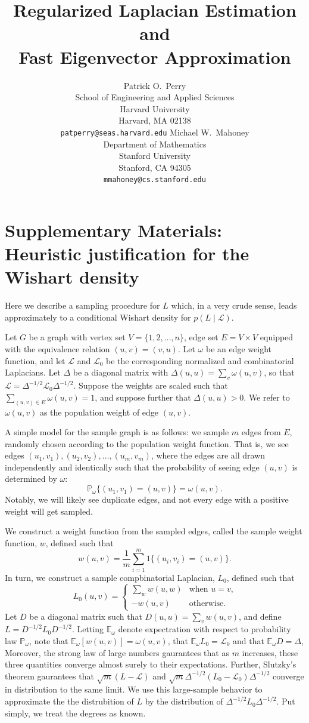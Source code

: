 \documentclass[12pt]{article}
\title{
  Regularized Laplacian Estimation
  and \\ Fast Eigenvector Approximation
}
\author{
  Patrick O.~Perry \\
  School of Engineering and Applied Sciences \\
  Harvard University \\
  Harvard, MA 02138 \\
  \texttt{patperry@seas.harvard.edu} 
  \And
  Michael W.~Mahoney \\
  Department of Mathematics \\
  Stanford University \\
  Stanford, CA 94305  \\
  \texttt{mmahoney@cs.stanford.edu}
}
\newcommand{\prob}{\mathbb{P}}
\newcommand{\E}{\mathbb{E}}
\theoremstyle{plain}
\begin{document}
\appendix

\section{Supplementary Materials: Heuristic justification for the Wishart density}
\label{sxn:justification}

Here we describe a sampling procedure for $L$ which, in a very crude
sense, leads approximately to a conditional Wishart density for $p(L
\mid \mathcal{L})$.

Let $G$ be a graph with vertex set $V = \{ 1, 2, \dotsc, n \}$, edge
set $E = V \times V$ equipped with the equivalence relation
$(u,v) = (v,u)$.  Let $\omega$ be an edge weight function, and let
$\mathcal{L}$ and $\mathcal{L}_0$ be the corresponding normalized and
combinatorial Laplacians.  Let $\Delta$ be a diagonal matrix with
$\Delta(u,u) = \sum_{v} \omega(u,v)$, so that
$\mathcal{L} = \Delta^{-1/2} \mathcal{L}_0 \Delta^{-1/2}$.  Suppose
the weights are scaled such that $\sum_{(u,v) \in E} \omega(u,v) = 1$,
and suppose further that $\Delta(u,u) > 0$.
We refer to $\omega(u,v)$ as the population weight of edge $(u,v)$.

A simple model for the sample graph is as follows: we sample $m$ edges
from $E$, randomly chosen according to the population weight function.
That is, we see edges $(u_1, v_1), (u_2, v_2), \dotsc, (u_m, v_m)$,
where the edges are all drawn independently and identically such that
the probability of seeing edge $(u,v)$ is determined by $\omega$:
\[
  \prob_\omega\{ (u_1, v_1) = (u,v) \} = \omega(u,v).
\]
Notably, we will likely see duplicate edges, and not every edge with a
positive weight will get sampled.

We construct a weight function from the sampled edges, called the
sample weight function, $w$, defined such that
\[
  w(u,v) = \frac{1}{m} \sum_{i=1}^{m} 1\{ (u_i, v_i) = (u,v) \}.
\]
In turn, we construct a sample compbinatorial Laplacian, $L_0$,
defined such that
\[
  L_0(u,v)
    =
    \begin{cases}
      \sum_{w} w(u,w) &\text{when $u = v$,} \\
      -w(u,v) &\text{otherwise.}
    \end{cases}
\]
Let $D$ be a diagonal matrix such that
$D(u,u) = \sum_{v} w(u,v)$, and define $L = D^{-1/2} L_0 D^{-1/2}$.
Letting $\E_\omega$ denote expectration with respect to probability
law $\prob_\omega$, note that $\E_\omega[w(u,v)] = \omega(u,v)$,
that $\E_\omega L_0 = \mathcal{L}_0$ and that $\E_\omega D = \Delta$,
Moreover, the strong law of large numbers gaurantees that as $m$ increases,
these three quantities converge almost surely to their expectations.
Further, Slutzky's theorem gaurantees that $\sqrt{m} (L - \mathcal{L})$ and
$\sqrt{m} \Delta^{-1/2} (L_0 - \mathcal{L}_0) \Delta^{-1/2}$ converge in
distribution to the same limit.  We use this large-sample behavior to
approximate the the distrubition of $L$ by the distribution of
$\Delta^{-1/2} L_0 \Delta^{-1/2}$.  Put simply, we treat the degrees as known.
\end{document}
